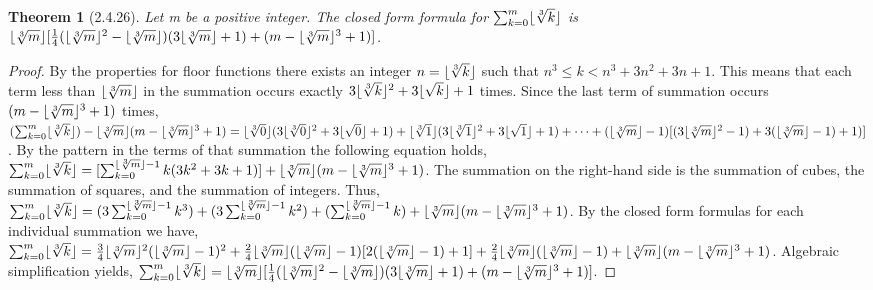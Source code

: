 \documentclass[a4paper, 12pt]{article}
\theoremstyle{plain}
\newtheorem*{theorem*}{Theorem}
\DeclarePairedDelimiter{\floor}{\lfloor}{\rfloor}
\begin{document}
	
	\begin{theorem*}[2.4.26]
		Let m be a positive integer. The closed form formula for $\sum_{k=0}^{m} \floor{\sqrt[3]{k}}$ is $\floor{\sqrt[3]{m}}[\frac{1}{4}(\floor{\sqrt[3]{m}}^{2} - \floor{\sqrt[3]{m}})(3\floor{\sqrt[3]{m}}+1)+(m - \floor{\sqrt[3]{m}}^{3} + 1)]$.
	\end{theorem*}
	
	\begin{proof}
		By the properties for floor functions there exists an integer $n = \floor{\sqrt[3]{k}}$ such that $n^{3} \le k < n^{3} + 3n^{2} + 3n + 1$. This means that each term less than $\floor{\sqrt[3]{m}}$ in the summation occurs exactly $3\floor{\sqrt[3]{k}}^{2} + 3\floor{\sqrt{k}} + 1$ times. Since the last term of summation occurs $(m - \floor{\sqrt[3]{m}}^{3} + 1)$ times, \newline $(\sum_{k=0}^{m} \floor{\sqrt[3]{k}}) - \floor{\sqrt[3]{m}}(m - \floor{\sqrt[3]{m}}^{3} + 1) = \newline \floor{\sqrt[3]{0}}(3\floor{\sqrt[3]{0}}^{2} + 3\floor{\sqrt{0}} + 1) +
		\floor{\sqrt[3]{1}}(3\floor{\sqrt[3]{1}}^{2} + 3\floor{\sqrt{1}} + 1) +
		\dots + \newline (\floor{\sqrt[3]{m}} - 1)[(3\floor{\sqrt[3]{m}}^{2}-1) + 3(\floor{\sqrt[3]{m}}-1) + 1)]$. By the pattern in the terms of that summation the following equation holds, $\sum_{k=0}^{m} \floor{\sqrt[3]{k}} = \newline [\sum_{k=0}^{\floor{\sqrt[3]{m}}-1} k(3k^{2} + 3k + 1)] + \floor{\sqrt[3]{m}}(m - \floor{\sqrt[3]{m}}^{3} + 1)$. The summation on the right-hand side is the summation of cubes, the summation of squares, and the summation of integers. Thus,  $\sum_{k=0}^{m} \floor{\sqrt[3]{k}} = \newline (3\sum_{k=0}^{\floor{\sqrt[3]{m}}-1} k^{3}) + (3\sum_{k=0}^{\floor{\sqrt[3]{m}}-1} k^{2}) + (\sum_{k=0}^{\floor{\sqrt[3]{m}}-1} k) + \floor{\sqrt[3]{m}}(m - \floor{\sqrt[3]{m}}^{3} + 1)$. By the closed form formulas for each individual summation we have, $\sum_{k=0}^{m} \floor{\sqrt[3]{k}} = \frac{3}{4}\floor{\sqrt[3]{m}}^{2}(\floor{\sqrt[3]{m}}-1)^{2} + \frac{2}{4}\floor{\sqrt[3]{m}}(\floor{\sqrt[3]{m}}-1)[2(\floor{\sqrt[3]{m}}-1) +1] + \newline \frac{2}{4}\floor{\sqrt[3]{m}}(\floor{\sqrt[3]{m}}-1) + \floor{\sqrt[3]{m}}(m - \floor{\sqrt[3]{m}}^{3} + 1)$. Algebraic simplification yields, \newline $\sum_{k=0}^{m} \floor{\sqrt[3]{k}} = \floor{\sqrt[3]{m}}[\frac{1}{4}(\floor{\sqrt[3]{m}}^{2} - \floor{\sqrt[3]{m}})(3\floor{\sqrt[3]{m}}+1)+(m - \floor{\sqrt[3]{m}}^{3} + 1)]$.
	\end{proof}
\end{document}

